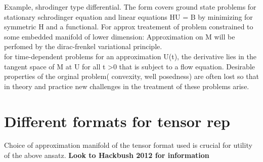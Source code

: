 \documentclass[10pt, draft]{article}
\begin{document}
Example, shrodinger type differential.  The form covers ground state problems for stationary schrodinger equation and linear equations HU = B by minimizing for symmetric H and a functional.  For approx treatement of problem constrained to some embedded manifold of lower dimension: Approximation on M will be perfomed by the dirac-frenkel variational principle.  \\
for time-dependent problems for an approximation U(t), the derivative lies in the tangent space of M at U for all t >0 that is subject to a flow equation.  Desirable properties of the orginal problem( convexity, well posedness) are often lost so that in theory and practice new challenges in the treatment of these problems arise.

\section{Different formats for tensor rep}
Choice of approximation manifold of the tensor format used is crucial for utility of the above ansatz.  \linebreak[1]
\textbf{Look to Hackbush 2012 for information}\linebreak[1]
\end{document}
